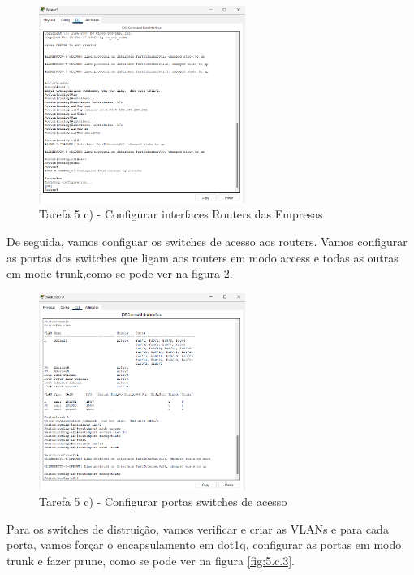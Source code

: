 \documentclass[11pt,english, openright, oneside]{book}
\begin{document}
\begin{figure}[H]
    \centering
    \includegraphics[width=0.6\textwidth]{imagens/Tarefa5/5.c.1.png}
    \caption{Tarefa 5 c) - Configurar interfaces Routers das Empresas}
    \label{fig:5.c.1}
\end{figure}

\vspace{0.2cm}

De seguida, vamos configuar os switches de acesso aos routers. Vamos configurar
as portas dos switches que ligam aos routers em modo access e todas as outras em
mode trunk,como se pode ver na figura \ref{fig:5.c.2}.

\begin{figure}[H]
    \centering
    \includegraphics[width=0.6\textwidth]{imagens/Tarefa5/5.c.2.png}
    \caption{Tarefa 5 c) - Configurar portas switches de acesso}
    \label{fig:5.c.2}
\end{figure}

\vspace{0.2cm}

Para os switches de distruição, vamos verificar e criar as VLANs e para cada
porta, vamos forçar o encapsulamento em dot1q, configurar as portas em modo
trunk e fazer prune, como se pode ver na figura \ref{fig:5.c.3}.
\end{document}
